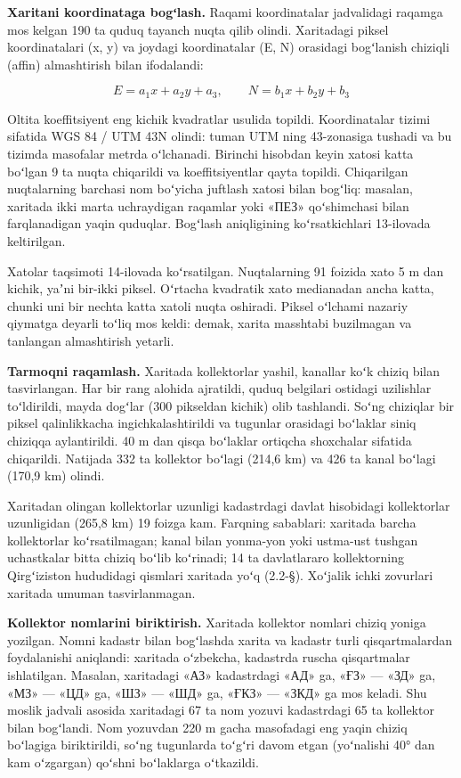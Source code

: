 \textbf{Xaritani koordinataga bogʻlash.} Raqami koordinatalar
jadvalidagi raqamga mos kelgan 190 ta quduq tayanch nuqta qilib olindi.
Xaritadagi piksel koordinatalari (x, y) va joydagi koordinatalar (E, N)
orasidagi bogʻlanish chiziqli (affin) almashtirish bilan ifodalandi:

\begin{equation}\tag{2.2}
E = a_1 x + a_2 y + a_3, \qquad N = b_1 x + b_2 y + b_3
\end{equation}

Oltita koeffitsiyent eng kichik kvadratlar usulida topildi.
Koordinatalar tizimi sifatida WGS 84 / UTM 43N olindi: tuman UTM ning
43-zonasiga tushadi va bu tizimda masofalar metrda oʻlchanadi. Birinchi
hisobdan keyin xatosi katta boʻlgan 9 ta nuqta chiqarildi va
koeffitsiyentlar qayta topildi. Chiqarilgan nuqtalarning barchasi nom
boʻyicha juftlash xatosi bilan bogʻliq: masalan, xaritada ikki marta
uchraydigan raqamlar yoki «ПЕЗ» qoʻshimchasi bilan farqlanadigan yaqin
quduqlar. Bogʻlash aniqligining koʻrsatkichlari 13-ilovada keltirilgan.

Xatolar taqsimoti 14-ilovada koʻrsatilgan. Nuqtalarning 91 foizida xato
5 m dan kichik, yaʼni bir-ikki piksel. Oʻrtacha kvadratik xato
medianadan ancha katta, chunki uni bir nechta katta xatoli nuqta
oshiradi. Piksel oʻlchami nazariy qiymatga deyarli toʻliq mos keldi:
demak, xarita masshtabi buzilmagan va tanlangan almashtirish yetarli.

\textbf{Tarmoqni raqamlash.} Xaritada kollektorlar yashil, kanallar koʻk
chiziq bilan tasvirlangan. Har bir rang alohida ajratildi, quduq
belgilari ostidagi uzilishlar toʻldirildi, mayda dogʻlar (300 pikseldan
kichik) olib tashlandi. Soʻng chiziqlar bir piksel qalinlikkacha
ingichkalashtirildi va tugunlar orasidagi boʻlaklar siniq chiziqqa
aylantirildi. 40 m dan qisqa boʻlaklar ortiqcha shoxchalar sifatida
chiqarildi. Natijada 332 ta kollektor boʻlagi (214,6 km) va 426 ta kanal
boʻlagi (170,9 km) olindi.

Xaritadan olingan kollektorlar uzunligi kadastrdagi davlat hisobidagi
kollektorlar uzunligidan (265,8 km) 19 foizga kam. Farqning sabablari:
xaritada barcha kollektorlar koʻrsatilmagan; kanal bilan yonma-yon yoki
ustma-ust tushgan uchastkalar bitta chiziq boʻlib koʻrinadi; 14 ta
davlatlararo kollektorning Qirgʻiziston hududidagi qismlari xaritada
yoʻq (2.2-§). Xoʻjalik ichki zovurlari xaritada umuman tasvirlanmagan.

\textbf{Kollektor nomlarini biriktirish.} Xaritada kollektor nomlari
chiziq yoniga yozilgan. Nomni kadastr bilan bogʻlashda xarita va kadastr
turli qisqartmalardan foydalanishi aniqlandi: xaritada oʻzbekcha,
kadastrda ruscha qisqartmalar ishlatilgan. Masalan, xaritadagi «АЗ»
kadastrdagi «АД» ga, «ҒЗ» --- «ЗД» ga, «МЗ» --- «ЦД» ga, «ШЗ» --- «ШД»
ga, «ҒКЗ» --- «ЗКД» ga mos keladi. Shu moslik jadvali asosida xaritadagi
67 ta nom yozuvi kadastrdagi 65 ta kollektor bilan bogʻlandi. Nom
yozuvdan 220 m gacha masofadagi eng yaqin chiziq boʻlagiga biriktirildi,
soʻng tugunlarda toʻgʻri davom etgan (yoʻnalishi 40° dan kam oʻzgargan)
qoʻshni boʻlaklarga oʻtkazildi.

